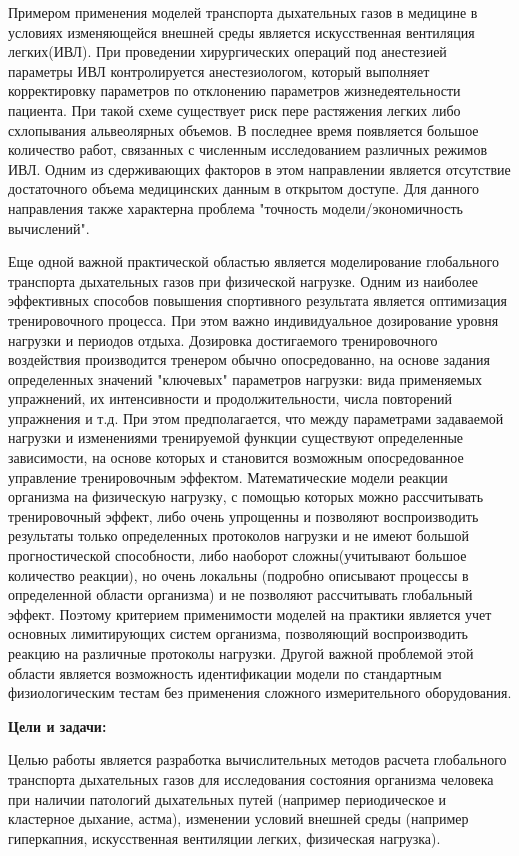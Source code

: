 Примером применения моделей транспорта дыхательных газов в медицине в условиях изменяющейся внешней среды является искусственная вентиляция легких(ИВЛ). При проведении хирургических операций под анестезией параметры ИВЛ контролируется анестезиологом, который выполняет корректировку параметров по отклонению параметров жизнедеятельности пациента. При такой схеме существует риск пере растяжения легких либо схлопывания альвеолярных объемов. В последнее время появляется большое количество работ, связанных с численным исследованием различных режимов ИВЛ. Одним из сдерживающих факторов в этом направлении является отсутствие достаточного объема медицинских данным в открытом доступе. Для данного направления также характерна проблема "точность модели/экономичность вычислений".   

Еще одной важной практической областью является моделирование глобального транспорта дыхательных газов при физической нагрузке. Одним из наиболее эффективных способов повышения спортивного результата является оптимизация тренировочного процесса. При этом важно индивидуальное дозирование уровня нагрузки и периодов отдыха. Дозировка достигаемого тренировочного воздействия производится тренером обычно опосредованно, на основе задания определенных значений "ключевых" параметров нагрузки: вида применяемых упражнений, их интенсивности и продолжительности, числа повторений упражнения и т.д. При этом предполагается, что между параметрами задаваемой нагрузки и изменениями тренируемой функции существуют определенные зависимости, на основе которых и становится возможным опосредованное управление тренировочным эффектом. Математические модели реакции организма на физическую нагрузку, с помощью которых можно рассчитывать тренировочный эффект, либо очень упрощенны и позволяют воспроизводить результаты только определенных протоколов нагрузки и не имеют большой прогностической способности, либо наоборот сложны(учитывают большое количество реакции), но очень локальны (подробно описывают процессы в определенной области организма) и не позволяют рассчитывать глобальный эффект. Поэтому критерием применимости моделей на практики является учет основных лимитирующих систем организма, позволяющий воспроизводить реакцию на различные протоколы нагрузки. Другой важной проблемой этой области является возможность идентификации модели по стандартным физиологическим тестам без применения сложного измерительного оборудования.         

\textbf{Цели и задачи:} 

Целью работы является разработка вычислительных методов расчета глобального транспорта дыхательных газов для исследования состояния организма человека при наличии патологий дыхательных путей (например периодическое и кластерное дыхание, астма), изменении условий внешней среды (например гиперкапния, искусственная вентиляции легких, физическая нагрузка).

